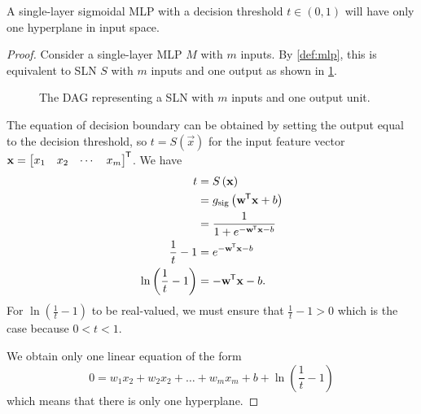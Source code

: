 \begin{lemma}
    \label{lmm:sigmoid_decision_boundary}
    A single-layer sigmoidal MLP with a decision threshold $t \in (0,1)$ will have only one hyperplane in input space.
\end{lemma}
\begin{proof}
    Consider a single-layer MLP $M$ with $m$ inputs. 
    By \ref{def:mlp}, this is equivalent to SLN $S$ with $m$ inputs and one output as shown in \ref{fig:sln_m_in_1_out}. 
    \begin{figure}
        \begin{center}
        \end{center}
        \caption{The DAG representing a SLN with $m$ inputs and one output unit.}
        \label{fig:sln_m_in_1_out}
    \end{figure}
    The equation of decision boundary can be obtained by setting the output equal to the decision threshold, so
    $t = S\left(\vec{x}\right)$
    for the input feature vector
    $\mathbf{x}= \begin{bmatrix}
        x_1 & x_2 & \cdots & x_m
    \end{bmatrix}^{\mkern-1.5mu\mathsf{T}}$.
    We have
    \begin{align*}
        t &= S\left(\mathbf{x}\right) \\
        &= g_\text{sig}\left(\mathbf{w}^{\mkern-1.5mu\mathsf{T}} \mathbf{x} + b\right) \\
        &= \frac{1}{1+e^{-\mathbf{w}^{\mkern-1.5mu\mathsf{T}} \mathbf{x} - b}} \\
        \frac{1}{t} - 1 &= e^{-\mathbf{w}^{\mkern-1.5mu\mathsf{T}} \mathbf{x} - b} \\
        \ln \left(\frac{1}{t} - 1\right) &= -\mathbf{w}^{\mkern-1.5mu\mathsf{T}} \mathbf{x} - b.
    \end{align*}
    For $\ln \left(\frac{1}{t} - 1\right)$ to be real-valued, we must ensure that $\frac{1}{t} - 1 > 0$ which is the case because $0<t<1$.

    We obtain only one linear equation of the form
    \begin{equation}
        \label{eq:sigmoid_hyperplane}
        0=w_1 x_2 + w_2 x_2 + \dots + w_m x_m + b + \ln \left(\frac{1}{t} - 1\right)
    \end{equation}
    which means that there is only one hyperplane.
\end{proof}


